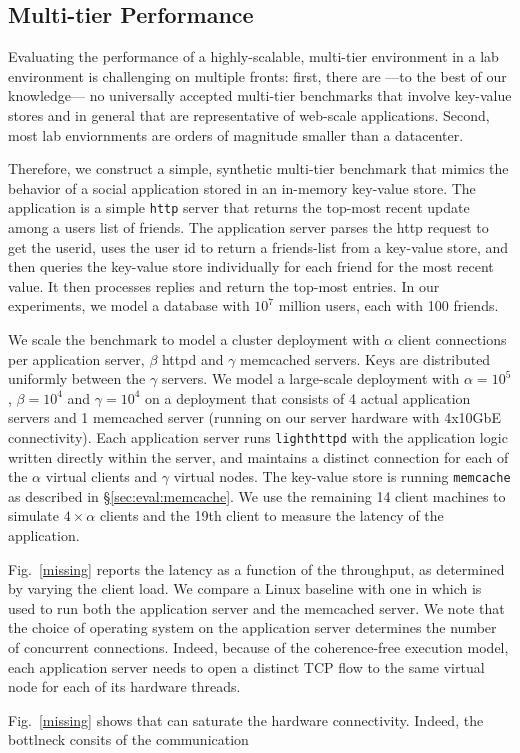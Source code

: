 
\subsection{Multi-tier Performance}


Evaluating the performance of a highly-scalable, multi-tier
environment in a lab environment is challenging on multiple fronts:
first, there are ---to the best of our knowledge--- no universally
accepted multi-tier benchmarks that involve key-value stores and in
general that are representative of web-scale applications.  Second,
most lab enviornments are orders of magnitude smaller than a
datacenter.

Therefore, we construct a simple, synthetic multi-tier benchmark that
mimics the behavior of a social application stored in an in-memory
key-value store.  The application is a simple \texttt{http} server
that returns the top-most recent update among a users list of friends.
The application server parses the http request to
get the userid, uses the user id to return a friends-list from a
key-value store, and then queries the key-value store individually for
each friend for the most recent value.  It then processes replies and
return the top-most entries.  In our experiments, we model a database
with $10^7$ million users, each with 100 friends. 

We scale the benchmark to model a cluster deployment with $\alpha$
client connections per application server, $\beta$ httpd and $\gamma$
memcached servers.  Keys are distributed uniformly between the
$\gamma$ servers.  We model a large-scale deployment with
$\alpha=10^5$, $\beta=10^4$ and $\gamma=10^4$ on a deployment that consists of 4
actual application servers and 1 memcached server (running on our
server hardware with 4x10GbE connectivity).  Each application server
runs \texttt{lighthttpd} with the application logic written directly
within the server, and maintains a distinct connection for each of the
$\alpha$ virtual clients and $\gamma$ virtual nodes.  The key-value store is
running \texttt{memcache} as described in \S\ref{sec:eval:memcache}.
We use the remaining 14 client machines to simulate $4 \times \alpha$
clients and the 19th client to measure the latency of the application.

Fig.~\ref{missing} reports the latency as a function of the
throughput, as determined by varying the client load.  We compare a
Linux baseline with one in which \ix is used to run both the
application server and the memcached server.  We note that the choice
of operating system on the application server determines the number of
concurrent connections. Indeed, because of the coherence-free
execution model, each application server needs to open a distinct TCP
flow to the same virtual node for each of its hardware threads.

 Fig.~\ref{missing} shows that \ix can saturate the
hardware connectivity.  Indeed, the bottlneck consits of the
communication 




